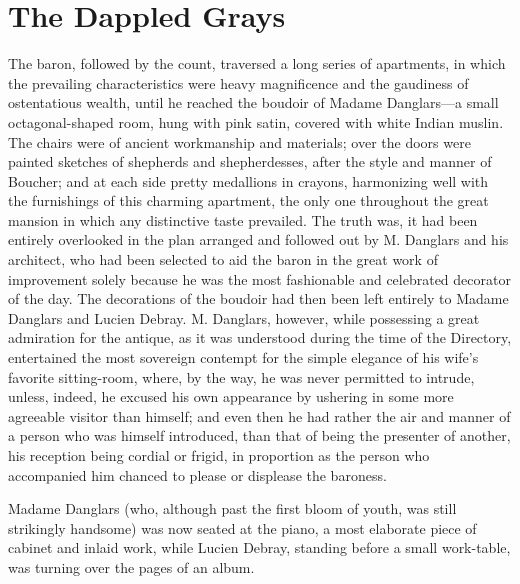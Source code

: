\chapter{The Dappled Grays}

The baron, followed by the count, traversed a long series of
apartments, in which the prevailing characteristics were heavy
magnificence and the gaudiness of ostentatious wealth, until he reached
the boudoir of Madame Danglars—a small octagonal-shaped room, hung with
pink satin, covered with white Indian muslin. The chairs were of
ancient workmanship and materials; over the doors were painted sketches
of shepherds and shepherdesses, after the style and manner of Boucher;
and at each side pretty medallions in crayons, harmonizing well with
the furnishings of this charming apartment, the only one throughout the
great mansion in which any distinctive taste prevailed. The truth was,
it had been entirely overlooked in the plan arranged and followed out
by M. Danglars and his architect, who had been selected to aid the
baron in the great work of improvement solely because he was the most
fashionable and celebrated decorator of the day. The decorations of the
boudoir had then been left entirely to Madame Danglars and Lucien
Debray. M. Danglars, however, while possessing a great admiration for
the antique, as it was understood during the time of the Directory,
entertained the most sovereign contempt for the simple elegance of his
wife’s favorite sitting-room, where, by the way, he was never permitted
to intrude, unless, indeed, he excused his own appearance by ushering
in some more agreeable visitor than himself; and even then he had
rather the air and manner of a person who was himself introduced, than
that of being the presenter of another, his reception being cordial or
frigid, in proportion as the person who accompanied him chanced to
please or displease the baroness.

Madame Danglars (who, although past the first bloom of youth, was still
strikingly handsome) was now seated at the piano, a most elaborate
piece of cabinet and inlaid work, while Lucien Debray, standing before
a small work-table, was turning over the pages of an album.

